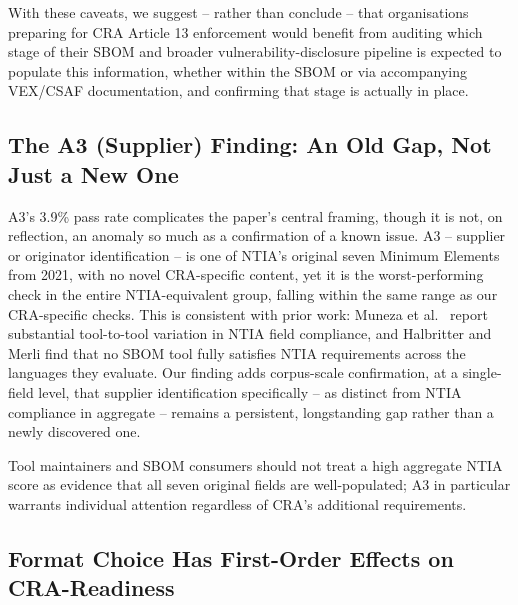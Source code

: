 \documentclass[11pt]{article}
\begin{document}
With these caveats, we suggest -- rather than conclude -- that organisations preparing for CRA Article 13 enforcement would benefit from auditing which stage of their SBOM and broader vulnerability-disclosure pipeline is expected to populate this information, whether within the SBOM or via accompanying VEX/CSAF documentation, and confirming that stage is actually in place.

\subsection{The A3 (Supplier) Finding: An Old Gap, Not Just a New One}
\label{sec:a3-discussion}

A3's 3.9\% pass rate complicates the paper's central framing, though it is not, on reflection, an anomaly so much as a confirmation of a known issue. A3 -- supplier or originator identification -- is one of NTIA's original seven Minimum Elements from 2021, with no novel CRA-specific content, yet it is the worst-performing check in the entire NTIA-equivalent group, falling within the same range as our CRA-specific checks. This is consistent with prior work: Muneza et al.\ \cite{muneza2025} report substantial tool-to-tool variation in NTIA field compliance, and Halbritter and Merli \cite{halbritter2024} find that no SBOM tool fully satisfies NTIA requirements across the languages they evaluate. Our finding adds corpus-scale confirmation, at a single-field level, that supplier identification specifically -- as distinct from NTIA compliance in aggregate -- remains a persistent, longstanding gap rather than a newly discovered one.

Tool maintainers and SBOM consumers should not treat a high aggregate NTIA score as evidence that all seven original fields are well-populated; A3 in particular warrants individual attention regardless of CRA's additional requirements.

\subsection{Format Choice Has First-Order Effects on CRA-Readiness}
\end{document}
